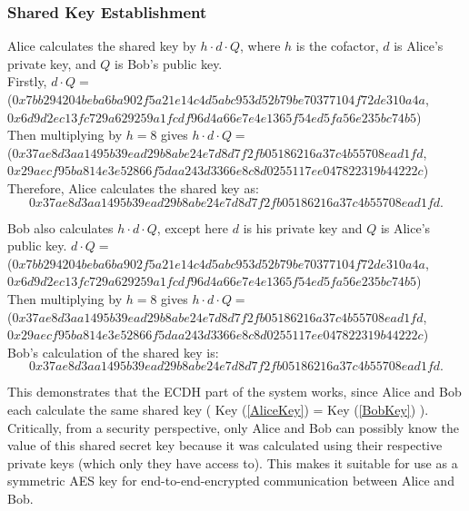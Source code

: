 \documentclass[12pt,a4paper]{article}
\begin{document}
\subsubsection{Shared Key Establishment}\noindent
Alice calculates the shared key by $h \cdot d \cdot Q$, 
where $h$ is the cofactor, $d$ is Alice's private key, and $Q$ is Bob's public key. \\
Firstly, $d \cdot Q = $\\
({\footnotesize $0x7bb294204beba6ba902f5a21e14c4d5abc953d52b79be70377104f72de310a4a$}, \\
{\footnotesize $0x6d9d2ec13fc729a629259a1fcdf96d4a66e7e4e1365f54ed5fa56e235bc74b5$}) \\
Then multiplying by $h = 8$ gives $h \cdot d \cdot Q = $\\
({\footnotesize $0x37ae8d3aa1495b39ead29b8abe24e7d8d7f2fb05186216a37c4b55708ead1fd$}, \\
{\footnotesize $0x29aecf95ba814e3e52866f5daa243d3366e8c8d0255117ee047822319b44222c$}) \\
Therefore, Alice calculates the shared key as: 
\begin{equation} \label{AliceKey}
    0x37ae8d3aa1495b39ead29b8abe24e7d8d7f2fb05186216a37c4b55708ead1fd.
\end{equation}

Bob also calculates $h \cdot d \cdot Q$, except here $d$ is his private key and $Q$ is Alice's public key. 
$d \cdot Q = $ \\
({\footnotesize $0x7bb294204beba6ba902f5a21e14c4d5abc953d52b79be70377104f72de310a4a$}, \\
{\footnotesize $0x6d9d2ec13fc729a629259a1fcdf96d4a66e7e4e1365f54ed5fa56e235bc74b5$}) \\
Then multiplying by $h = 8$ gives $h \cdot d \cdot Q = $\\
({\footnotesize $0x37ae8d3aa1495b39ead29b8abe24e7d8d7f2fb05186216a37c4b55708ead1fd$}, \\
{\footnotesize $0x29aecf95ba814e3e52866f5daa243d3366e8c8d0255117ee047822319b44222c$}) \\
Bob's calculation of the shared key is: 
\begin{equation} \label{BobKey}
    0x37ae8d3aa1495b39ead29b8abe24e7d8d7f2fb05186216a37c4b55708ead1fd.
\end{equation}

This demonstrates that the ECDH part of the system works, since Alice and Bob each calculate the same shared key ( Key (\ref{AliceKey}) = Key (\ref{BobKey}) ). 
Critically, from a security perspective, only Alice and Bob can possibly know the value of this shared secret key 
because it was calculated using their respective private keys (which only they have access to). 
This makes it suitable for use as a symmetric AES key for end-to-end-encrypted communication between Alice and Bob. 
\end{document}
